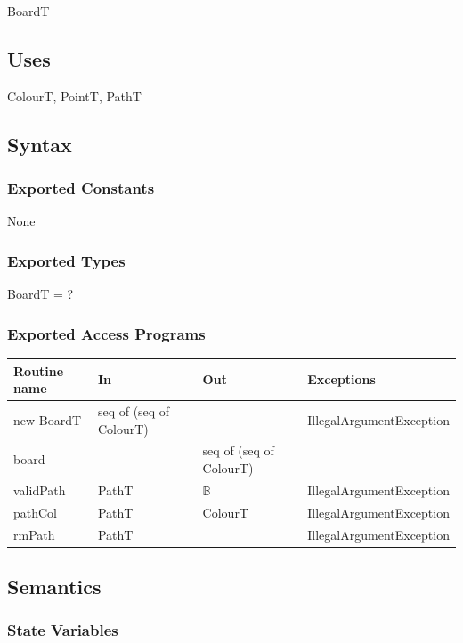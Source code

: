 \documentclass[12pt]{article}
\begin{document}
BoardT

\subsection* {Uses}

ColourT, PointT, PathT

\subsection* {Syntax}

\subsubsection* {Exported Constants}

None

\subsubsection* {Exported Types}

BoardT = ?

\subsubsection* {Exported Access Programs}

\begin{tabular}{| l | l | l | l |}
	\hline
	\textbf{Routine name} & \textbf{In} & \textbf{Out} & \textbf{Exceptions}\\
	\hline
	new BoardT & seq of (seq of ColourT) & ~ & IllegalArgumentException \\
	\hline
	board & ~ & seq of (seq of ColourT) & ~ \\
	\hline
	validPath & PathT & $\mathbb{B}$ & IllegalArgumentException\\
	\hline
	pathCol & PathT & ColourT & IllegalArgumentException\\
	\hline
	rmPath & PathT & ~ & IllegalArgumentException\\
	\hline
\end{tabular}

\subsection* {Semantics}

\subsubsection* {State Variables}
\end{document}
